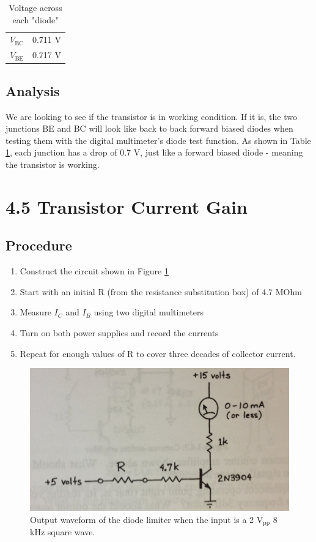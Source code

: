 \documentclass[12pt,letterpaper]{report}
\newlength \figwidth
\begin{document}
\begin{table}[ht]
\caption{Voltage across each "diode"} %
\centering 
    \begin{tabular}{| c | c |} 
    \hline
    $V_{\text{BC}}$ & 0.711 V \\
    $V_{\text{BE}}$ & 0.717 V \\
    \hline
    \end{tabular}
    \label{table:section_1}
\end{table}

\subsection*{Analysis}

We are looking to see if the transistor is in working condition. If it is, the two junctions BE and BC will look like back to back forward biased diodes when testing them with the digital multimeter's diode test function. As shown in Table \ref{table:section_1}, each junction has a drop of 0.7 V, just like a forward biased diode - meaning the transistor is working.

\section*{4.5 Transistor Current Gain}
\subsection*{Procedure}

\begin{enumerate}
\item Construct the circuit shown in Figure \ref{fig:4.5_circuit}
\item Start with an initial R (from the resistance substitution box) of 4.7 MOhm
\item Measure $I_C$ and $I_B$ using two digital multimeters
\item Turn on both power supplies and record the currents
\item Repeat for enough values of R to cover three decades of collector current.
\end{enumerate}

\begin{figure}[H]
\centering
\includegraphics[width=\figwidth, keepaspectratio=true]{lab5/circuit_2.jpg}
\caption{Output waveform of the diode limiter when the input is a 2 $\text{V}_{\text{pp}}$ 8 kHz square wave.}
\label{fig:4.5_circuit}
\end{figure}
\end{document}
